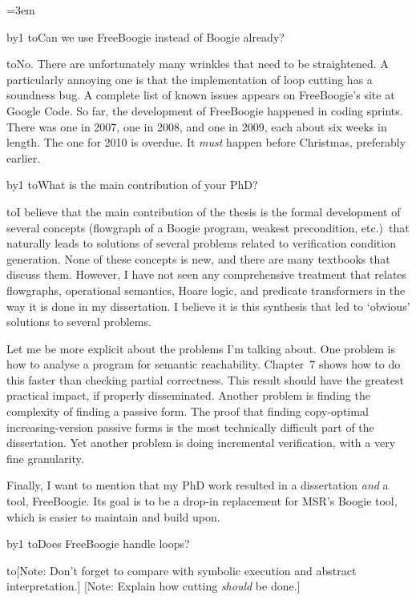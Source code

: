 \parindent=3em
\def\para#1{%
  \medskip\penalty-250%
  \noindent\hbox to\parindent{\hss\bf#1 }}
\newcount\qcnt{}
\def\A{\para{A\number\qcnt:}}
\def\Q{\advance\qcnt by1\para{Q\number\qcnt:}}
\def\limp{\Rightarrow}

\Q Can we use FreeBoogie instead of Boogie already?

\A No. There are unfortunately many wrinkles that need to be straightened.
A particularly annoying one is that the implementation of loop cutting has
a soundness bug. A complete list of known issues appears on FreeBoogie's
site at Google Code. So far, the development of FreeBoogie happened in
coding sprints. There was one in 2007, one in 2008, and one in 2009, each
about six weeks in length. The one for 2010 is overdue. It {\it must\/}
happen before Christmas, preferably earlier.

\Q What is the main contribution of your PhD?

\A I believe that the main contribution of the thesis is the formal
development of several concepts (flowgraph of a Boogie program, weakest
precondition, etc.)\ that naturally leads to solutions of several problems
related to verification condition generation. None of these concepts is
new, and there are many textbooks that discuss them. However, I have not
seen any comprehensive treatment that relates flowgraphs, operational
semantics, Hoare logic, and predicate transformers in the way it is done in
my dissertation.  I believe it is this synthesis that led to `obvious'
solutions to several problems.

Let me be more explicit about the problems I'm talking about.  One problem
is how to analyse a program for semantic reachability.  Chapter~7 shows how
to do this faster than checking partial correctness.  This result should
have the greatest practical impact, if properly disseminated. Another
problem is finding the complexity of finding a passive form. The proof that
finding copy-optimal increasing-version passive forms is the most
technically difficult part of the dissertation. Yet another problem is
doing incremental verification, with a very fine granularity.

Finally, I want to mention that my PhD work resulted in a dissertation {\it
and\/} a tool, FreeBoogie. Its goal is to be a drop-in replacement for
MSR's Boogie tool, which is easier to maintain and build upon.


\Q Does FreeBoogie handle loops?

\A [Note: Don't forget to compare with symbolic execution and abstract
interpretation.] [Note: Explain how cutting {\it should\/} be done.]

